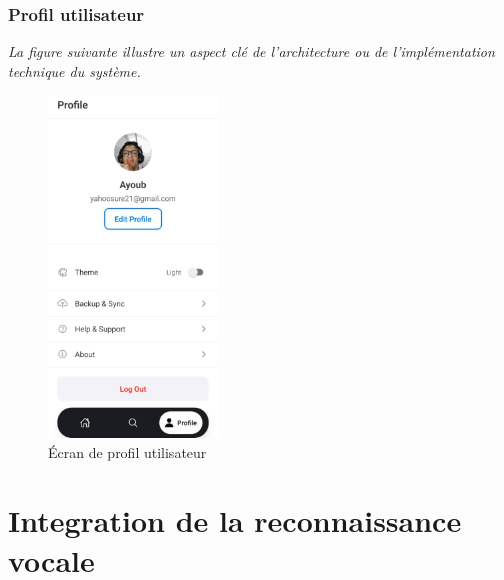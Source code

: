 \subsubsection{Profil utilisateur}
\noindent
\textit{La figure suivante illustre un aspect clé de l'architecture ou de l'implémentation technique du système.}
\begin{figure}[H]
    \centering
    \includegraphics[width=0.4\textwidth]{assets/docs/mobile/profile-screen.png}
    \caption{Écran de profil utilisateur}
    \label{fig:mobile-profile}
\end{figure}

\section{Integration de la reconnaissance vocale}
